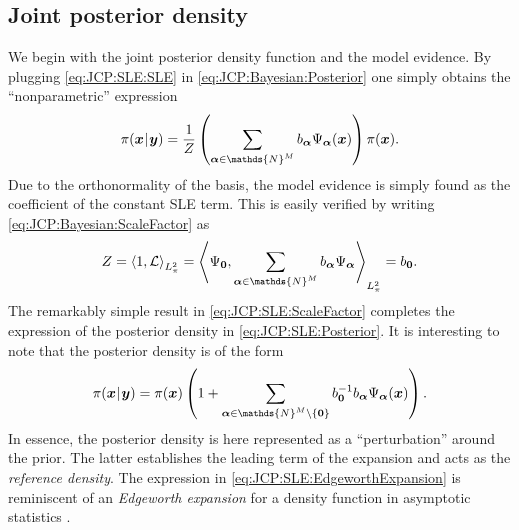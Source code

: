 \subsection{Joint posterior density}
We begin with the joint posterior density function and the model evidence.
By plugging \cref{eq:JCP:SLE:SLE} in \cref{eq:JCP:Bayesian:Posterior} one simply obtains the ``nonparametric'' expression
\begin{equation} \label{eq:JCP:SLE:Posterior}
  \pi(\bm{x} \cond \bm{y}) = \frac{1}{\scale} \left( \sum\limits_{\bm{\alpha} \in \mathds{N}^\dimParam} \coeffL_{\bm{\alpha}} \basis_{\bm{\alpha}}(\bm{x}) \right) \pi(\bm{x}).
\end{equation}
Due to the orthonormality of the basis, the model evidence is simply found as the coefficient of the constant SLE term.
This is easily verified by writing \cref{eq:JCP:Bayesian:ScaleFactor} as
\begin{equation} \label{eq:JCP:SLE:ScaleFactor}
  \scale = \left\langle 1, \mathcal{L} \right\rangle_{L_{\pi}^2}
  = \left\langle \basis_{\bm{0}}, \sum\limits_{\bm{\alpha} \in \mathds{N}^\dimParam} \coeffL_{\bm{\alpha}} \basis_{\bm{\alpha}} \right\rangle_{L_{\pi}^2} = \coeffL_{\bm{0}}.
\end{equation}
The remarkably simple result in \cref{eq:JCP:SLE:ScaleFactor} completes the expression of the posterior density in \cref{eq:JCP:SLE:Posterior}.
It is interesting to note that the posterior density is of the form
\begin{equation} \label{eq:JCP:SLE:EdgeworthExpansion}
  \pi(\bm{x} \cond \bm{y}) = \pi(\bm{x})
  \left( 1 + \sum\limits_{\bm{\alpha} \in \mathds{N}^\dimParam \setminus \{\bm{0}\}} \coeffL_{\bm{0}}^{-1} \coeffL_{\bm{\alpha}} \basis_{\bm{\alpha}}(\bm{x}) \right).
\end{equation}
In essence, the posterior density is here represented as a ``perturbation'' around the prior.
The latter establishes the leading term of the expansion and acts as the \emph{reference density}.
The expression in \cref{eq:JCP:SLE:EdgeworthExpansion} is reminiscent of an \emph{Edgeworth expansion} for a density function
in asymptotic statistics \cite{Statistics:BarndorffNielsen1989,Statistics:Kolassa2006,Statistics:Small2010}.

